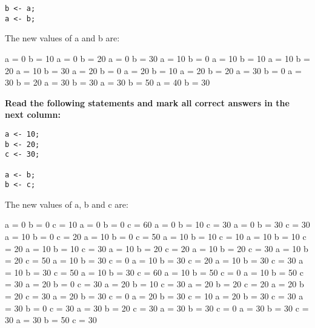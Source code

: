 \documentclass[10pt]{exam}
\begin{document}
\begin{questions}
\begin{minipage}[t][][t]{0.18\textwidth}
\begin{lstlisting}
b <- a;
a <- b;
  \end{lstlisting}
\end{minipage}
  \hfill
\begin{minipage}[t][][t]{0.75\textwidth}
  The new values of a and b are:
  \begin{multicols*}{3}
\begin{checkboxes}
    \choice a = 0 b = 10
    \choice a = 0 b = 20
    \choice a = 0 b = 30
    \choice a = 10 b = 0
    \choice a = 10 b = 10
    \choice a = 10 b = 20
    \choice a = 10 b = 30
    \choice a = 20 b = 0
    \choice a = 20 b = 10
    \choice a = 20 b = 20
    \choice a = 30 b = 0
    \choice a = 30 b = 20
    \choice a = 30 b = 30
    \choice a = 30 b = 50
    \choice a = 40 b = 30
  \end{checkboxes}
\end{multicols*}
\end{minipage}

\vspace{1cm}  \begin{minipage}[t][][t]{0.18\textwidth}
\question \bf Read the following statements and mark all correct answers in the next column: \raggedright
  \begin{lstlisting}
a <- 10;
b <- 20;
c <- 30;

a <- b;
b <- c;    
  \end{lstlisting}
\end{minipage}
  \hfill
\begin{minipage}[t][][t]{0.75\textwidth}
  The new values of a, b and c are:
  \begin{multicols*}{3}
\begin{checkboxes}
    \choice a = 0 b = 0 c = 10
    \choice a = 0 b = 0 c = 60
    \choice a = 0 b = 10 c = 30
    \choice a = 0 b = 30 c = 30
    \choice a = 10 b = 0 c = 20
    \choice a = 10 b = 0 c = 50
    \choice a = 10 b = 10 c = 10
    \choice a = 10 b = 10 c = 20
    \choice a = 10 b = 10 c = 30
    \choice a = 10 b = 20 c = 20
    \choice a = 10 b = 20 c = 30
    \choice a = 10 b = 20 c = 50
    \choice a = 10 b = 30 c = 0
    \choice a = 10 b = 30 c = 20
    \choice a = 10 b = 30 c = 30
    \choice a = 10 b = 30 c = 50
    \choice a = 10 b = 30 c = 60
    \choice a = 10 b = 50 c = 0
    \choice a = 10 b = 50 c = 30
    \choice a = 20 b = 0 c = 30
    \choice a = 20 b = 10 c = 30
    \choice a = 20 b = 20 c = 20
    \choice a = 20 b = 20 c = 30
    \choice a = 20 b = 30 c = 0
    \choice a = 20 b = 30 c = 10
    \choice a = 20 b = 30 c = 30
    \choice a = 30 b = 0 c = 30
    \choice a = 30 b = 20 c = 30
    \choice a = 30 b = 30 c = 0
    \choice a = 30 b = 30 c = 30
    \choice a = 30 b = 50 c = 30
  \end{checkboxes}
\end{multicols*}
\end{minipage}


\end{questions}
\end{document}
